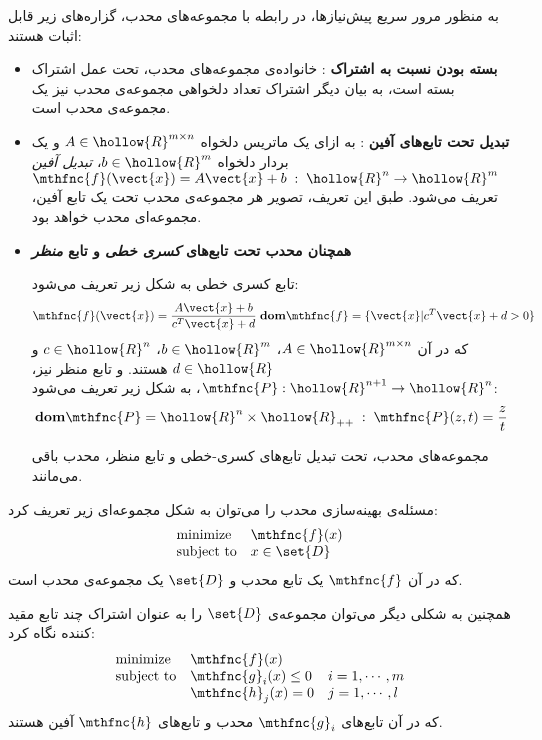 \documentclass[a4paper,11px]{article}
\begin{document}
به منظور مرور سریع پیش‌نیازها، در رابطه با مجموعه‌های محدب، گزاره‌های زیر قابل اثبات هستند:
\begin{itemize}
\item \textbf{
بسته بودن نسبت به اشتراک
}: 
خانواده‌ی مجموعه‌های محدب، تحت عمل اشتراک بسته است، به بیان دیگر اشتراک تعداد دلخواهی مجموعه‌ی محدب نیز یک مجموعه‌ی محدب است.

\item \textbf{
تبدیل تحت تابع‌های آفین
}: 
به ازای یک ماتریس دلخواه 
$A \in \hollow{R}^{m \times n}$ 
و یک بردار دلخواه 
$b \in \hollow{R}^{m}$، 
\textit{
تبدیل آفین
} 
$\mthfnc{f}( \vect{x} ) = A \vect{x} + b \; : \; \hollow{R}^{n} \rightarrow \hollow{R}^{m}$ 
تعریف می‌شود. طبق این تعریف، تصویر هر مجموعه‌ی محدب تحت یک تابع آفین، مجموعه‌ای محدب خواهد بود.

\item \textbf{
همچنان محدب تحت تابع‌های 
\textit{
کسری خطی
}
و تابع
\textit{
منظر
}
}

تابع کسری خطی به شکل زیر تعریف می‌شود:
\[
\mthfnc{f}( \vect{x} ) = \frac{ A \vect{x} + b }{ c^T \vect{x} + d } \; \mathbf{dom} \mthfnc{f} = \{ \vect{x} | c^T \vect{x} + d > 0 \}
\]
که در آن 
$A \in \hollow{R}^{m \times n}$، 
$b \in \hollow{R}^m$، 
$c \in \hollow{R}^{n}$ 
و 
$d \in \hollow{R}$ 
هستند. و تابع منظر نیز، 
$\mthfnc{P} : \hollow{R}^{n+1} \rightarrow \hollow{R}^n$، 
به شکل زیر تعریف می‌شود:
\[
\mathbf{dom} \mthfnc{P} = \hollow{R}^{n} \times \hollow{R}_{++} \; : \; \mthfnc{P}(z,t) = \frac{z}{t}
\]

مجموعه‌های محدب، تحت تبدیل تابع‌های کسری-خطی و تابع منظر، محدب باقی می‌مانند.





\end{itemize}




مسئله‌ی بهینه‌سازی محدب را می‌توان به شکل مجموعه‌ای زیر تعریف کرد:
\[
\begin{array}{ll}
\mbox{minimize} & \mthfnc{f}( x )\\
\mbox{subject to} & x \in \set{D}
\end{array}
\]
که در آن 
$\mthfnc{f}$ 
یک تابع محدب و 
$\set{D}$ 
یک مجموعه‌ی محدب است.

همچنین به شکلی دیگر می‌توان مجموعه‌ی 
$\set{D}$ 
را به عنوان اشتراک چند تابع مقید کننده نگاه کرد:
\[
\begin{array}{lll}
\mbox{minimize} & \mthfnc{f}( x )\\
\mbox{subject to} & \mthfnc{g}_i(x) \leq 0 & i = 1, \cdots, m\\
 & \mthfnc{h}_j(x) = 0 & j = 1, \cdots, l
\end{array}
\]
که در آن تابع‌های 
$\mthfnc{g}_i$ 
محدب و تابع‌های 
$\mthfnc{h}$ 
آفین هستند.
\end{document}
